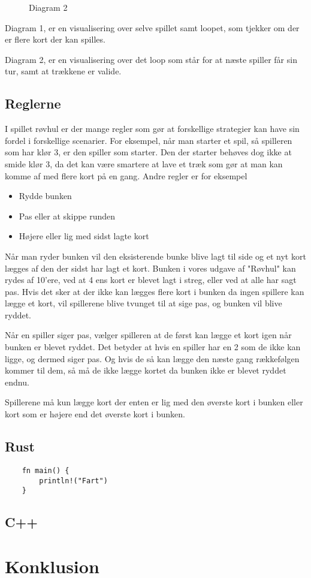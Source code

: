 \documentclass[a4paper, 12pt]{article}
\begin{document}
\begin{figure}[H]
	\centering
	
	\caption{Diagram 2}
\end{figure}

Diagram 1, er en visualisering over selve spillet samt loopet, som tjekker om der er flere kort der kan spilles.
\bigbreak

Diagram 2, er en visualisering over det loop som står for at næste spiller får sin tur, samt at trækkene er valide.

\vfill
\pagebreak


\subsection{Reglerne}
I spillet røvhul er der mange regler som gør at forskellige strategier kan have sin fordel i forskellige scenarier. For eksempel, når man starter et spil, så spilleren som har klør 3, er den spiller som starter. Den der starter behøves dog ikke at smide klør 3, da det kan være smartere at lave et træk som gør at man kan komme af med flere kort på en gang. Andre regler er for eksempel

\begin{itemize}
	\item Rydde bunken
	\item Pas eller at skippe runden
	\item Højere eller lig med sidst lagte kort
\end{itemize}

Når man ryder bunken vil den eksisterende bunke blive lagt til side og et nyt kort lægges af den der sidst har lagt et kort. Bunken i vores udgave af "Røvhul" kan rydes af 10'ere, ved at 4 ens kort er blevet lagt i streg, eller ved at alle har sagt pas. Hvis det sker at der ikke kan lægges flere kort i bunken da ingen spillere kan lægge et kort, vil spillerene blive tvunget til at sige pas, og bunken vil blive ryddet.

Når en spiller siger pas, vælger spilleren at de først kan lægge et kort igen når bunken er blevet ryddet. Det betyder at hvis en spiller har en 2 som de ikke kan ligge, og dermed siger pas. Og hvis de så kan lægge den næste gang rækkefølgen kommer til dem, så må de ikke lægge kortet da bunken ikke er blevet ryddet endnu.

Spillerene må kun lægge kort der enten er lig med den øverste kort i bunken eller kort som er højere end det øverste kort i bunken.

\subsection{Rust}


\begin{verbatim}
	fn main() {
		println!("Fart")
	}
\end{verbatim}


\subsection{C++}


\vfill
\pagebreak

\section{Konklusion}

\vfill
\pagebreak
\end{document}
